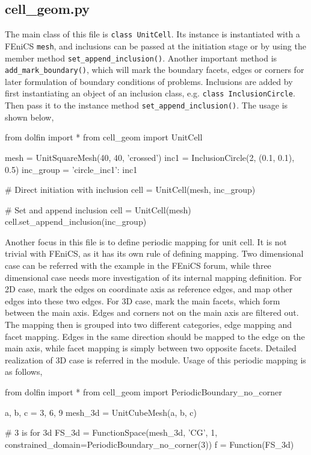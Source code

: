 \documentclass[10pt,a4paper]{scrreprt}
\begin{document}
\subsection{cell\_geom.py}
The main class of this file is \texttt{class UnitCell}. Its instance is instantiated with a FEniCS \texttt{mesh}, and inclusions can be passed at the initiation stage or by using the member method \texttt{set\_append\_inclusion()}. Another important method is \texttt{add\_mark\_boundary()}, which will mark the boundary facets, edges or corners for later formulation of boundary conditions of problems. Inclusions are added by first instantiating an object of an inclusion class, e.g. \texttt{class InclusionCircle}. Then pass it to the instance method \texttt{set\_append\_inclusion()}. The usage is shown below,

\begin{python}
from dolfin import *
from cell_geom import UnitCell

mesh = UnitSquareMesh(40, 40, 'crossed')
inc1 = InclusionCircle(2, (0.1, 0.1), 0.5)
inc_group = {'circle_inc1': inc1}

# Direct initiation with inclusion
cell = UnitCell(mesh, inc_group)

# Set and append inclusion
cell = UnitCell(mesh)
cell.set_append_inclusion(inc_group)
\end{python}

Another focus in this file is to define periodic mapping for unit cell. It is not trivial with FEniCS, as it has its own rule of defining mapping. Two dimensional case can be referred with the example in the FEniCS forum, while three dimensional case needs more investigation of its internal mapping definition. For 2D case, mark the edges on coordinate axis as reference edges, and map other edges into these two edges. For 3D case, mark the main facets, which form between the main axis. Edges and corners not on the main axis are filtered out. The mapping then is grouped into two different categories, edge mapping and facet mapping. Edges in the same direction should be mapped to the edge on the main axis, while facet mapping is simply between two opposite facets. Detailed realization of 3D case is referred in the module. Usage of this periodic mapping is as follows,

\begin{python}
from dolfin import *
from cell_geom import PeriodicBoundary_no_corner

a, b, c = 3, 6, 9
mesh_3d = UnitCubeMesh(a, b, c)

# 3 is for 3d
FS_3d = FunctionSpace(mesh_3d, 'CG', 1, constrained_domain=PeriodicBoundary_no_corner(3))
f = Function(FS_3d)
\end{python}
\end{document}
